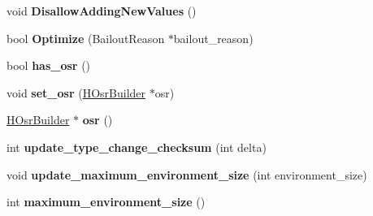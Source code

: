 \begin{DoxyCompactItemize}
\item 
\hypertarget{classv8_1_1internal_1_1_v8___f_i_n_a_l_a4ca2e3b710c50af4777f035e1c7671a7}{}void {\bfseries Disallow\+Adding\+New\+Values} ()\label{classv8_1_1internal_1_1_v8___f_i_n_a_l_a4ca2e3b710c50af4777f035e1c7671a7}

\item 
\hypertarget{classv8_1_1internal_1_1_v8___f_i_n_a_l_a632bcd14b6466276e6c85f16d7d774ac}{}bool {\bfseries Optimize} (Bailout\+Reason $\ast$bailout\+\_\+reason)\label{classv8_1_1internal_1_1_v8___f_i_n_a_l_a632bcd14b6466276e6c85f16d7d774ac}

\item 
\hypertarget{classv8_1_1internal_1_1_v8___f_i_n_a_l_a3ce3b5543f1d80c2760e635f346ce804}{}bool {\bfseries has\+\_\+osr} ()\label{classv8_1_1internal_1_1_v8___f_i_n_a_l_a3ce3b5543f1d80c2760e635f346ce804}

\item 
\hypertarget{classv8_1_1internal_1_1_v8___f_i_n_a_l_a2d8391d5fb17b48f40cd082a581bd194}{}void {\bfseries set\+\_\+osr} (\hyperlink{classv8_1_1internal_1_1_h_osr_builder}{H\+Osr\+Builder} $\ast$osr)\label{classv8_1_1internal_1_1_v8___f_i_n_a_l_a2d8391d5fb17b48f40cd082a581bd194}

\item 
\hypertarget{classv8_1_1internal_1_1_v8___f_i_n_a_l_af6d35a3c9df118d1c6585d1498d143fd}{}\hyperlink{classv8_1_1internal_1_1_h_osr_builder}{H\+Osr\+Builder} $\ast$ {\bfseries osr} ()\label{classv8_1_1internal_1_1_v8___f_i_n_a_l_af6d35a3c9df118d1c6585d1498d143fd}

\item 
\hypertarget{classv8_1_1internal_1_1_v8___f_i_n_a_l_a436a578bb682f9bb2d15e62f8dc0deae}{}int {\bfseries update\+\_\+type\+\_\+change\+\_\+checksum} (int delta)\label{classv8_1_1internal_1_1_v8___f_i_n_a_l_a436a578bb682f9bb2d15e62f8dc0deae}

\item 
\hypertarget{classv8_1_1internal_1_1_v8___f_i_n_a_l_aac8fa5cac2f03aebf81e945b74be4c2a}{}void {\bfseries update\+\_\+maximum\+\_\+environment\+\_\+size} (int environment\+\_\+size)\label{classv8_1_1internal_1_1_v8___f_i_n_a_l_aac8fa5cac2f03aebf81e945b74be4c2a}

\item 
\hypertarget{classv8_1_1internal_1_1_v8___f_i_n_a_l_a23d0128dcc034d6588274062523f8bb5}{}int {\bfseries maximum\+\_\+environment\+\_\+size} ()\label{classv8_1_1internal_1_1_v8___f_i_n_a_l_a23d0128dcc034d6588274062523f8bb5}


\end{DoxyCompactItemize}
